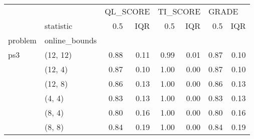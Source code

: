 \begin{tabular}{llrrrrrr}
\toprule
    & {} & \multicolumn{2}{l}{QL\_SCORE} & \multicolumn{2}{l}{TI\_SCORE} & \multicolumn{2}{l}{GRADE} \\
    & statistic &      0.5 &  IQR &      0.5 &  IQR &   0.5 &  IQR \\
problem & online\_bounds &          &      &          &      &       &      \\
\midrule
ps3 & (12, 12) &     0.88 & 0.11 &     0.99 & 0.01 &  0.87 & 0.10 \\
    & (12, 4) &     0.87 & 0.10 &     1.00 & 0.00 &  0.87 & 0.10 \\
    & (12, 8) &     0.86 & 0.13 &     1.00 & 0.00 &  0.86 & 0.13 \\
    & (4, 4) &     0.83 & 0.13 &     1.00 & 0.00 &  0.83 & 0.13 \\
    & (8, 4) &     0.80 & 0.16 &     1.00 & 0.00 &  0.80 & 0.16 \\
    & (8, 8) &     0.84 & 0.19 &     1.00 & 0.00 &  0.84 & 0.19 \\
\bottomrule
\end{tabular}
